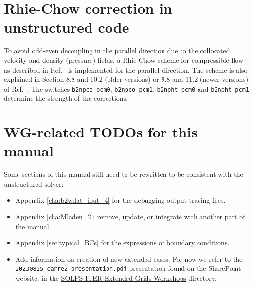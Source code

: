 \section{Rhie-Chow correction in unstructured code}

To avoid odd-even decoupling in the parallel direction due to the
collocated velocity and density (pressure) fields, a Rhie-Chow scheme
for compressible flow as described in Ref.~\cite{MOUKALLED2016} is implemented for the
parallel direction. The scheme is also explained in Section 8.8 and 10.2 (older versions) or 9.8 and 11.2 (newer versions) of Ref.~\cite{FERZIGER2019}.
The switches {\tt b2npco\_pcm0}, {\tt b2npco\_pcm1}, {\tt b2npht\_pcm0} and {\tt b2npht\_pcm1} determine the strength of the corrections.

\section{WG-related TODOs for this manual}

Some sections of this manual still need to be rewritten to be consistent with the unstructured solver:

\begin{itemize}
\item Appendix \ref{cha:b2wdat_iout_4} for the debugging output tracing files.
\item Appendix \ref{cha:Mladen_2}: remove, update, or integrate with another part of the manual.
\item Appendix \ref{sec:typical_BCs} for the expressions of boundary conditions.
\item Add information on creation of new extended cases. For now we refer to the {\tt 20230815\_carre2\_presentation.pdf} presentation found on the \SOLPSITER SharePoint website, in the \href{https://sharepoint.iter.org/departments/POP/CM/IMAS/SOLPS-ITER/SOLPS-ITER\%20Extended\%20Grids\%20Workshops}{SOLPS-ITER Extended Grids Workshops} directory.
\end{itemize}

